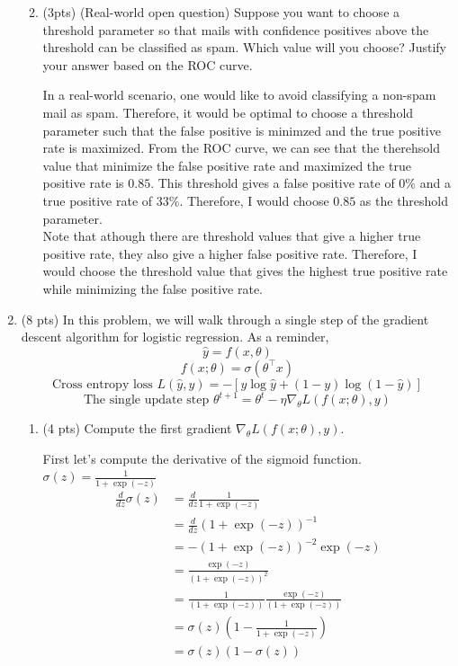 \documentclass[a4paper]{article}
\theoremstyle{definition}
\newenvironment{soln}{
    \leavevmode\color{blue}\ignorespaces
}{}
\begin{document}
\begin{enumerate}
\begin{enumerate}
\begin{soln}
	\end{soln}
	
	\item (3pts) (Real-world open question) Suppose you want to choose a threshold parameter so that mails with confidence positives above the threshold can be classified as spam. Which value will you choose? Justify your answer based on the ROC curve.
	
	\begin{soln} 
		In a real-world scenario, one would like to avoid classifying a non-spam mail as spam. Therefore, it would be optimal to choose a threshold parameter such that the false positive is minimzed and the true positive rate is maximized. From the ROC curve, we can see that the therehsold value that minimize the false positive rate and maximized the true positive rate is $0.85$. This threshold gives a false positive rate of $0\%$ and a true positive rate of $33\%$. Therefore, I would choose $0.85$ as the threshold parameter. \\ 

		Note that athough there are threshold values that give a higher true positive rate, they also give a higher false positive rate. Therefore, I would choose the threshold value that gives the highest true positive rate while minimizing the false positive rate.
	\end{soln}
\end{enumerate}

\item (8 pts) In this problem, we will walk through a single step of the gradient descent algorithm for logistic regression. As a reminder,
$$\hat{y} = f(x, \theta)$$
$$f(x;\theta) = \sigma(\theta^\top x)$$
$$\text{Cross entropy loss } L(\hat{y}, y) = -[y \log  \hat{y} + (1-y)\log(1-\hat{y})]$$
$$\text{The single update step } \theta^{t+1} = \theta^{t} - \eta \nabla_{\theta} L(f(x;\theta), y) $$



\begin{enumerate}
	\item (4 pts) Compute the first gradient $\nabla_{\theta} L(f(x;\theta), y)$.
	
	\begin{soln}  
		First let's compute the derivative of the sigmoid function. $\sigma(z) = \frac{1}{1 + \exp{(-z)}}$
		\begin{align*}
			\frac{d}{dz} \sigma(z) &= \frac{d}{dz} \frac{1}{1 + \exp{(-z)}} \\
			&= \frac{d}{dz} (1 + \exp{(-z)})^{-1} \\
			&= -(1 + \exp{(-z)})^{-2} \exp{(-z)} \\
			&= \frac{\exp{(-z)}}{(1 + \exp{(-z)})^2} \\
			&= \frac{1}{(1 + \exp{(-z)})} \frac{\exp{(-z)}}{(1 + \exp{(-z)})} \\
			&= \sigma(z) (1 - \frac{1}{1+\exp{(-z)}})\\
			&= \sigma(z) (1 - \sigma(z)) \\
		\end{align*}


\end{soln}
\end{enumerate}
\end{enumerate}
\end{document}
